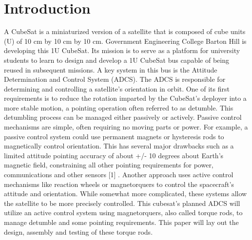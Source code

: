 \chapter*{Introduction}

A CubeSat is a miniaturized version of a satellite that is composed of cube units (U) of 10 cm by 10 cm by
10 cm. Government Engineering College Barton Hill is developing this 1U CubeSat. Its mission is to serve as
a platform for university students to learn to design and develop a 1U CubeSat bus capable of being reused in
subsequent missions. A key system in this bus is the Attitude Determination and Control System (ADCS). The
ADCS is responsible for determining and controlling a satellite’s orientation in orbit. One of its first requirements is
to reduce the rotation imparted by the CubeSat’s deployer into a more stable motion, a pointing operation often
referred to as detumble. This detumbling process can be managed either passively or actively. Passive control
mechanisms are simple, often requiring no moving parts or power. For example, a passive control system could use
permanent magnets or hysteresis rods to magnetically control orientation. This has several major drawbacks such as
a limited attitude pointing accuracy of about +/- 10 degrees about Earth’s magnetic field, constraining all other
pointing requirements for power, communications and other sensors [1] . Another approach uses active control
mechanisms like reaction wheels or magnetorquers to control the spacecraft’s attitude and orientation. While
somewhat more complicated, these systems allow the satellite to be more precisely controlled. This cubesat's planned
ADCS will utilize an active control system using magnetorquers, also called torque rods, to manage detumble and
some pointing requirements. This paper will lay out the design, assembly and testing of these torque rods.